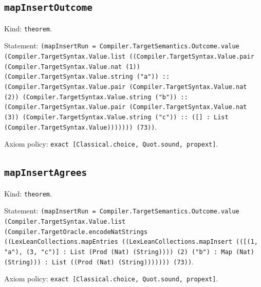 \documentclass[11pt]{article}
\begin{document}
\subsection*{\texttt{mapInsertOutcome}}
\noindent Kind: \texttt{theorem}.\par
\noindent Statement: \texttt{(mapInsertRun = Compiler.TargetSemantics.Outcome.value (Compiler.TargetSyntax.Value.list ((Compiler.TargetSyntax.Value.pair (Compiler.TargetSyntax.Value.nat (1)) (Compiler.TargetSyntax.Value.string ("a")) :: (Compiler.TargetSyntax.Value.pair (Compiler.TargetSyntax.Value.nat (2)) (Compiler.TargetSyntax.Value.string ("b")) :: (Compiler.TargetSyntax.Value.pair (Compiler.TargetSyntax.Value.nat (3)) (Compiler.TargetSyntax.Value.string ("c")) :: ([] : List (Compiler.TargetSyntax.Value))))))) (73))}.\par
\noindent Axiom policy: \texttt{exact [Classical.choice, Quot.sound, propext]}.\par
\subsection*{\texttt{mapInsertAgrees}}
\noindent Kind: \texttt{theorem}.\par
\noindent Statement: \texttt{(mapInsertRun = Compiler.TargetSemantics.Outcome.value (Compiler.TargetSyntax.Value.list (Compiler.TargetOracle.encodeNatStrings ((LexLeanCollections.mapEntries ((LexLeanCollections.mapInsert (([(1, "a"), (3, "c")] : List (Prod (Nat) (String)))) (2) ("b") : Map (Nat) (String))) : List ((Prod (Nat) (String))))))) (73))}.\par
\noindent Axiom policy: \texttt{exact [Classical.choice, Quot.sound, propext]}.\par
\end{document}
